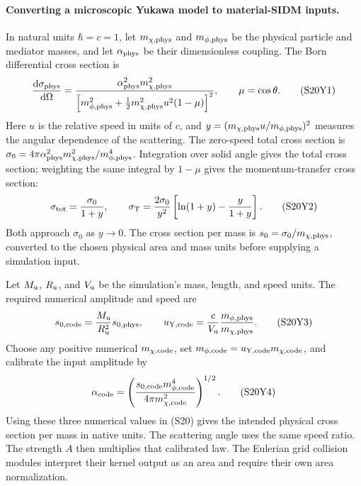 \paragraph{Converting a microscopic Yukawa model to material-SIDM inputs.}
\label{sec:yukawa-material-units}
In natural units \(\hbar=c=1\), let \(m_{\chi,{\rm phys}}\) and
\(m_{\phi,{\rm phys}}\) be the physical particle and mediator masses, and
let \(\alpha_{\rm phys}\) be their dimensionless coupling.  The Born
differential cross section is
\[
 \frac{\mathrm d\sigma_{\rm phys}}{\mathrm d\Omega}
 =\frac{\alpha_{\rm phys}^2m_{\chi,{\rm phys}}^2}
 {\left[m_{\phi,{\rm phys}}^2+
 \tfrac12m_{\chi,{\rm phys}}^2u^2(1-\mu)\right]^2},
 \qquad \mu=\cos\theta.                                  \tag{S20Y1}
\]
Here \(u\) is the relative speed in units of \(c\), and
\(y=(m_{\chi,{\rm phys}}u/m_{\phi,{\rm phys}})^2\) measures the angular
dependence of the scattering.  The zero-speed total cross section is
\(\sigma_0=4\pi\alpha_{\rm phys}^2m_{\chi,{\rm phys}}^2/
m_{\phi,{\rm phys}}^4\).  Integration over solid angle gives the total
cross section; weighting the same integral by \(1-\mu\) gives the
momentum-transfer cross section:
\[
 \sigma_{\rm tot}=\frac{\sigma_0}{1+y},\qquad
 \sigma_{\rm T}=\frac{2\sigma_0}{y^2}
       \left[\ln(1+y)-\frac{y}{1+y}\right].              \tag{S20Y2}
\]
Both approach \(\sigma_0\) as \(y\to0\).  The cross section per mass is
\(s_0=\sigma_0/m_{\chi,{\rm phys}}\), converted to the chosen physical
area and mass units before supplying a simulation input.

Let \(M_{\rm u}\), \(R_{\rm u}\), and \(V_{\rm u}\) be the simulation's
mass, length, and speed units.  The required numerical amplitude and speed are
\[
 s_{0,{\rm code}}=\frac{M_{\rm u}}{R_{\rm u}^2}s_{0,{\rm phys}},
 \qquad
 u_{{\rm Y},{\rm code}}=
 \frac{c}{V_{\rm u}}\frac{m_{\phi,{\rm phys}}}{m_{\chi,{\rm phys}}}.
                                                               \tag{S20Y3}
\]
Choose any positive numerical \(m_{\chi,{\rm code}}\), set
\(m_{\phi,{\rm code}}=u_{{\rm Y},{\rm code}}m_{\chi,{\rm code}}\),
and calibrate the input amplitude by
\[
 \alpha_{{\rm code}}=
 \left(\frac{s_{0,{\rm code}}m_{\phi,{\rm code}}^4}
 {4\pi m_{\chi,{\rm code}}^2}\right)^{1/2}.               \tag{S20Y4}
\]
Using these three numerical values in (S20) gives the intended physical
cross section per mass in native units.  The scattering angle uses the same
speed ratio.  The strength \(A\) then multiplies that calibrated law.
The Eulerian grid collision modules interpret their kernel output as an
area and require their own area normalization.

